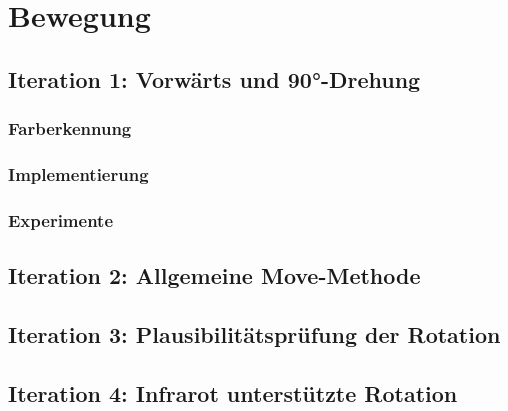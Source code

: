 
\section{Bewegung}

\subsection{Iteration 1: Vorwärts und 90°-Drehung}

\subsubsection{Farberkennung}


\subsubsection{Implementierung}


\subsubsection{Experimente}


\subsection{Iteration 2: Allgemeine Move-Methode}


\subsection{Iteration 3: Plausibilitätsprüfung der Rotation}


\subsection{Iteration 4: Infrarot unterstützte Rotation}
